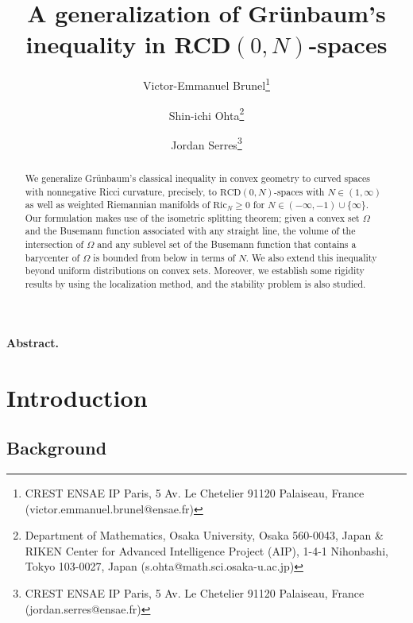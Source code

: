 \documentclass[sts]{imsart}
\theoremstyle{definition}
\theoremstyle{remark}
\newcommand{\RCD}{\mathrm{RCD}}
\newcommand{\Ric}{\mathrm{Ric}}
\begin{document}
\begin{frontmatter}

\title{A generalization of Gr\"{u}nbaum's inequality in RCD$(0,N)$-spaces}

\author{Victor-Emmanuel Brunel\thanks{CREST ENSAE IP Paris, 5 Av. Le Chetelier 91120 Palaiseau, France ({\sf victor.emmanuel.brunel@ensae.fr})}
\and
Shin-ichi Ohta\thanks{
Department of Mathematics, Osaka University,
Osaka 560-0043, Japan \&
RIKEN Center for Advanced Intelligence Project (AIP),
1-4-1 Nihonbashi, Tokyo 103-0027, Japan
({\sf s.ohta@math.sci.osaka-u.ac.jp})}
\and
Jordan Serres\thanks{CREST ENSAE IP Paris, 5 Av. Le Chetelier 91120 Palaiseau, France
({\sf jordan.serres@ensae.fr})}}


 {{\bf Abstract.} } 
\begin{abstract}
We generalize Gr\"{u}nbaum's classical inequality in convex geometry to curved spaces with nonnegative Ricci curvature,
precisely, to $\RCD(0,N)$-spaces with $N \in (1,\infty)$ as well as weighted Riemannian manifolds of $\Ric_N \ge 0$ for $N \in (-\infty,-1) \cup \{\infty\}$.
Our formulation makes use of the isometric splitting theorem; given a convex set $\Omega$ and the Busemann function associated with any straight line, the volume of the intersection of $\Omega$ and any sublevel set of the Busemann function that contains a barycenter of $\Omega$ is bounded from below in terms of $N$. We also extend this inequality beyond uniform distributions on convex sets. Moreover, we establish some rigidity results by using the localization method, and the stability problem is also studied.
%
\end{abstract}
\end{frontmatter}


\section{Introduction}%

\subsection{Background}%
\end{document}
